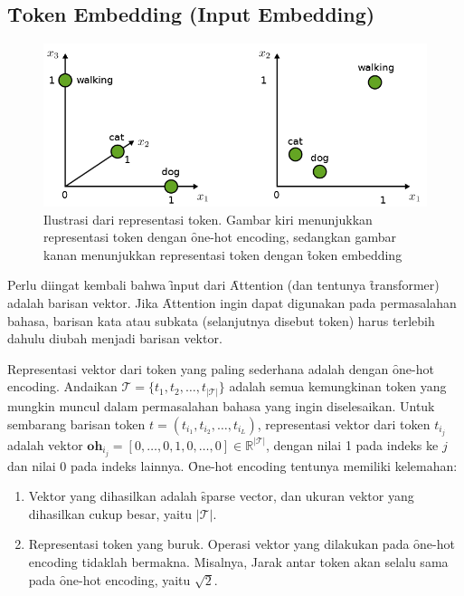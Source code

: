 	\subsection{\f{Token Embedding (Input Embedding)}}
	\label{sec:token-embedding}

	\begin{figure}
		\centering
		\includegraphics[width=1\textwidth]{assets/pics/token-embedding.png}
		\caption{Ilustrasi dari representasi token. Gambar kiri menunjukkan representasi token dengan \f{one-hot encoding}, sedangkan gambar kanan menunjukkan representasi token dengan \f{token embedding} \citep{geiger2022deeplearning}}
		\label{fig:token-embedding}
	\end{figure}

	Perlu diingat kembali bahwa \f{input} dari \f{Attention} (dan tentunya \f{transformer}) adalah barisan vektor. Jika \f{Attention} ingin dapat digunakan pada permasalahan bahasa, barisan kata atau subkata (selanjutnya disebut token) harus terlebih dahulu diubah menjadi barisan vektor.

	Representasi vektor dari token yang paling sederhana adalah dengan \f{one-hot encoding}. Andaikan $\mathcal{T} = \{t_1, t_2, \dots, t_{|\mathcal{T}|}\}$ adalah semua kemungkinan token yang mungkin muncul dalam permasalahan bahasa yang ingin diselesaikan. Untuk sembarang barisan token $t = (t_{i_1}, t_{i_2}, \dots, t_{i_L})$, representasi vektor dari token $t_{i_j}$ adalah vektor $\mathbf{oh}_{i_j} = [0, \dots, 0, 1, 0, \dots, 0] \in \mathbb{R}^{|\mathcal{T}|}$, dengan nilai 1 pada indeks ke $j$ dan nilai 0 pada indeks lainnya. \f{One-hot encoding} tentunya memiliki kelemahan:

	\begin{enumerate}
		\item Vektor yang dihasilkan adalah \f{sparse vector}, dan ukuran vektor yang dihasilkan cukup besar, yaitu $|\mathcal{T}|$.
		\item Representasi token yang buruk. Operasi vektor yang dilakukan pada \f{one-hot encoding} tidaklah bermakna. Misalnya, Jarak antar token akan selalu sama pada \f{one-hot encoding}, yaitu $\sqrt{2}$.
	\end{enumerate}

